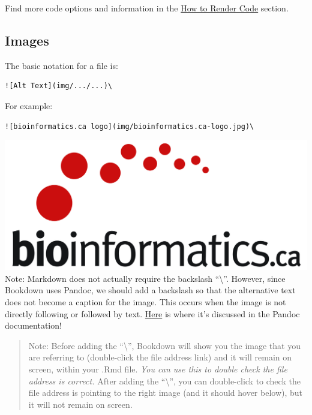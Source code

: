 \documentclass[
]{book}
\theoremstyle{definition}
\theoremstyle{definition}
\theoremstyle{definition}
\theoremstyle{definition}
\theoremstyle{remark}
\begin{document}
Find more code options and information in the \hyperref[render-code]{How to Render Code} section.

\subsection*{Images}\label{images}

The basic notation for a file is:

\begin{verbatim}
![Alt Text](img/.../...)\
\end{verbatim}

For example:

\begin{verbatim}
![bioinformatics.ca logo](img/bioinformatics.ca-logo.jpg)\
\end{verbatim}

\includegraphics{img/bioinformatics.ca-logo.jpg}\\

Note: Markdown does not actually require the backslash ``\textbackslash{}''. However, since Bookdown uses Pandoc, we should add a backslash so that the alternative text does not become a caption for the image. This occurs when the image is not directly following or followed by text. \href{https://pandoc.org/MANUAL.html\#extension-implicit_figures}{Here} is where it's discussed in the Pandoc documentation!

\begin{quote}
Note: Before adding the ``\textbackslash{}'', Bookdown will show you the image that you are referring to (double-click the file address link) and it will remain on screen, within your .Rmd file. \emph{You can use this to double check the file address is correct.} After adding the ``\textbackslash{}'', you can double-click to check the file address is pointing to the right image (and it should hover below), but it will not remain on screen.
\end{quote}
\end{document}
